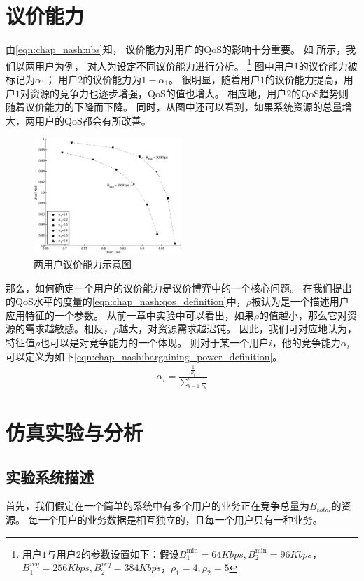 \section{议价能力}
由\eqref{eqn:chap_nash:nbs}知，
议价能力对用户的QoS的影响十分重要。
如 所示，我们以两用户为例，
对人为设定不同议价能力进行分析。
\footnote{用户$1$与用户$2$的参数设置如下：假设$B_1^{\min}=64Kbps, B_2^{\min}=96Kbps$，$B_1^{req}=256Kbps, B_2^{req}=384Kbps$，$\rho_1=4, \rho_2=5$}
图中用户$1$的议价能力被标记为$\alpha_1$；
用户$2$的议价能力为$1-\alpha_1$。
很明显，随着用户$1$的议价能力提高，用户$1$对资源的竞争力也逐步增强，QoS的值也增大。
相应地，用户$2$的QoS趋势则随着议价能力的下降而下降。
同时，从图中还可以看到，如果系统资源的总量增大，两用户的QoS都会有所改善。
\begin{figure}[!tb] 
    \centering 
    \includegraphics[width = 0.5\textwidth]{chap_nash_two_users_nbs_qos.eps} 
    \caption{两用户议价能力示意图}
    \label{fig:chap_nash:two_users_nbs_qos} 
\end{figure}
那么，如何确定一个用户的议价能力是议价博弈中的一个核心问题。
在我们提出的QoS水平的度量的\eqref{eqn:chap_nash:qos_definition}中，$\rho$被认为是一个描述用户应用特征的一个参数。
从前一章中实验中可以看出，如果$\rho$的值越小，那么它对资源的需求越敏感。相反，$\rho$越大，对资源需求越迟钝。
因此，我们可对应地认为，特征值$\rho$也可以是对竞争能力的一个体现。
则对于某一个用户$i$，他的竞争能力$\alpha_i$可以定义为如下\eqref{eqn:chap_nash:bargaining_power_definition}。
\begin{align}
    \alpha_i = \frac{\frac{1}{\rho_i}}{\sum_{k=1}^n \frac{1}{\rho_k} }
    \label{eqn:chap_nash:bargaining_power_definition}
\end{align}
\section{仿真实验与分析}
\subsection{实验系统描述}
首先，我们假定在一个简单的系统中有多个用户的业务正在竞争总量为$B_{total}$的资源。
每一个用户的业务数据是相互独立的，且每一个用户只有一种业务。
